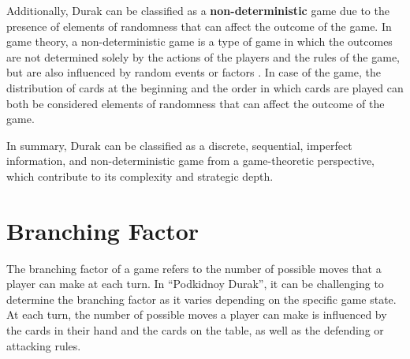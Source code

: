 Additionally, Durak can be classified as a \textbf{non-deterministic} game due to the presence of elements of randomness that can affect the outcome of the game. In game theory, a non-deterministic game is a type of game in which the outcomes are not determined solely by the actions of the players and the rules of the game, but are also influenced by random events or factors \citep{Gametheory4}. In case of the game, the distribution of cards at the beginning and the order in which cards are played can both be considered elements of randomness that can affect the outcome of the game.

In summary, Durak can be classified as a discrete, sequential, imperfect information, and non-deterministic game from a game-theoretic perspective, which contribute to its complexity and strategic depth.


\section{Branching Factor}

The branching factor of a game refers to the number of possible moves that a player can make at each turn. In ``Podkidnoy Durak'', it can be challenging to determine the branching factor as it varies depending on the specific game state. At each turn, the number of possible moves a player can make is influenced by the cards in their hand and the cards on the table, as well as the defending or attacking rules.